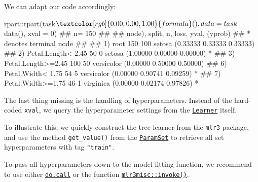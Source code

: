 \documentclass[]{article}
\newenvironment{Shaded}{}{}
\newcommand{\DataTypeTok}[1]{#1}
\newcommand{\DecValTok}[1]{#1}
\newcommand{\KeywordTok}[1]{\textcolor[rgb]{0.00,0.00,1.00}{#1}}
\newcommand{\NormalTok}[1]{#1}
\newcommand{\OperatorTok}[1]{#1}
\newcommand{\StringTok}[1]{\textcolor[rgb]{0.00,0.50,0.50}{#1}}
\renewenvironment{Shaded} {\begin{snugshade}\small} {\end{snugshade}}
\begin{document}
We can adapt our code accordingly:

\begin{Shaded}
\begin{Highlighting}[]
\NormalTok{rpart}\OperatorTok{::}\KeywordTok{rpart}\NormalTok{(task}\OperatorTok{$}\KeywordTok{formula}\NormalTok{(), }\DataTypeTok{data =}\NormalTok{ task}\OperatorTok{$}\KeywordTok{data}\NormalTok{(), }\DataTypeTok{xval =} \DecValTok{0}\NormalTok{)}
\NormalTok{## n= 150 }
\NormalTok{## }
\NormalTok{## node), split, n, loss, yval, (yprob)}
\NormalTok{##       * denotes terminal node}
\NormalTok{## }
\NormalTok{## 1) root 150 100 setosa (0.33333 0.33333 0.33333)  }
\NormalTok{##   2) Petal.Length< 2.45 50   0 setosa (1.00000 0.00000 0.00000) *}
\NormalTok{##   3) Petal.Length>=2.45 100  50 versicolor (0.00000 0.50000 0.50000)  }
\NormalTok{##     6) Petal.Width< 1.75 54   5 versicolor (0.00000 0.90741 0.09259) *}
\NormalTok{##     7) Petal.Width>=1.75 46   1 virginica (0.00000 0.02174 0.97826) *}
\end{Highlighting}
\end{Shaded}

The last thing missing is the handling of hyperparameters.
Instead of the hard-coded \texttt{xval}, we query the hyperparameter settings from the \href{https://mlr3.mlr-org.com/reference/Learner.html}{\texttt{Learner}} itself.

To illustrate this, we quickly construct the tree learner from the \texttt{mlr3} package, and use the method \texttt{get\_value()} from the \href{https://paradox.mlr-org.com/reference/ParamSet.html}{\texttt{ParamSet}} to retrieve all set hyperparameters with tag \texttt{"train"}.

\begin{Shaded}
\end{Shaded}

To pass all hyperparameters down to the model fitting function, we recommend to use either \href{https://www.rdocumentation.org/packages/base/topics/do.call}{\texttt{do.call}} or the function \href{https://mlr3misc.mlr-org.com/reference/invoke.html}{\texttt{mlr3misc::invoke()}}.
\end{document}
